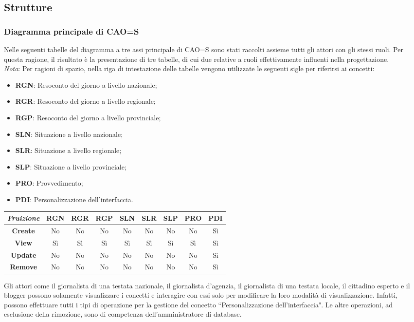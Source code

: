 \subsection{Strutture}
\label{ss:strutture}
\subsubsection{Diagramma principale di CAO=S}
\label{sss:diagramma-principale-caos}
Nelle seguenti tabelle del diagramma a tre assi principale di CAO=S sono stati raccolti assieme tutti gli attori con gli stessi ruoli.
Per questa ragione, il risultato è la presentazione di tre tabelle, di cui due relative a ruoli effettivamente influenti nella progettazione.\\
\textit{Nota}: Per ragioni di spazio, nella riga di intestazione delle tabelle vengono utilizzate le seguenti sigle per riferirsi ai concetti:
\begin{itemize}
    \item \textbf{RGN}: Resoconto del giorno a livello nazionale;
    \item \textbf{RGR}: Resoconto del giorno a livello regionale;
    \item \textbf{RGP}: Resoconto del giorno a livello provinciale;
    \item \textbf{SLN}: Situazione a livello nazionale;
    \item \textbf{SLR}: Situazione a livello regionale;
    \item \textbf{SLP}: Situazione a livello provinciale;
    \item \textbf{PRO}: Provvedimento;
    \item \textbf{PDI}: Personalizzazione dell'interfaccia.
\end{itemize}

{
\renewcommand{\arraystretch}{2}
\begin{longtable}[h]{| c | c | c | c | c | c | c | c | c |}
    \hline
    \textit{Fruizione} & \textbf{RGN} & \textbf{RGR} & \textbf{RGP} & \textbf{SLN} & \textbf{SLR} & \textbf{SLP} & \textbf{PRO} & \textbf{PDI} \\
    \hline
    \endhead
    \textbf{Create} & No & No & No & No & No & No & No & Sì \\
    \hline
    \textbf{View}   & Sì & Sì & Sì & Sì & Sì & Sì & Sì & Sì \\
    \hline
    \textbf{Update} & No & No & No & No & No & No & No & Sì \\
    \hline
    \textbf{Remove} & No & No & No & No & No & No & No & Sì \\
    \hline
\end{longtable}
}
\noindent
Gli attori come il giornalista di una testata nazionale, il giornalista d'agenzia, il giornalista di una testata locale, il cittadino esperto e il blogger possono solamente visualizzare i concetti e interagire con essi solo per modificare la loro modalità di visualizzazione.
Infatti, possono effettuare tutti i tipi di operazione per la gestione del concetto ``Personalizzazione dell'interfaccia".
Le altre operazioni, ad esclusione della rimozione, sono di competenza dell'amministratore di database.

